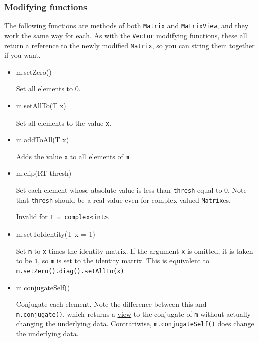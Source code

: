 \documentclass[twoside,letterpaper,11pt]{article}
\renewcommand{\tt}[1]{{\lstinline {#1}}}
\begin{document}
\subsubsection{Modifying functions}

The following functions are methods of both \tt{Matrix} and \tt{MatrixView},
and they work the same way for each.
As with the \tt{Vector} modifying functions, these all return a reference
to the newly modified \tt{Matrix}, so you can string them together if you want.

\begin{itemize}

\item
\begin{tmvcode}
m.setZero()
\end{tmvcode}
Set all elements to 0.

\item
\begin{tmvcode}
m.setAllTo(T x)
\end{tmvcode}
Set all elements to the value \tt{x}.

\item
\begin{tmvcode}
m.addToAll(T x)
\end{tmvcode}
Adds the value \tt{x} to all elements of \tt{m}.

\item
\begin{tmvcode}
m.clip(RT thresh)
\end{tmvcode}
Set each element whose absolute value is less than \tt{thresh} equal to 0.
Note that \tt{thresh} should be a real value even for complex valued
\tt{Matrix}es.  

Invalid for \tt{T = complex<int>}.

\item
\begin{tmvcode}
m.setToIdentity(T x = 1)
\end{tmvcode}
Set \tt{m} to \tt{x} times the identity matrix.
If the argument \tt{x} is omitted, it is 
taken to be \tt{1}, so \tt{m} is set to the identity matrix.
This is equivalent to \tt{m.setZero().diag().setAllTo(x)}.

\item 
\begin{tmvcode}
m.conjugateSelf()
\end{tmvcode}
Conjugate each element.  Note the difference between this and \tt{m.conjugate()}, 
which returns a \underline{view} to the conjugate of \tt{m} without
actually changing the underlying data.  Contrariwise, \tt{m.conjugateSelf()}
does change the underlying data.


\end{itemize}
\end{document}
